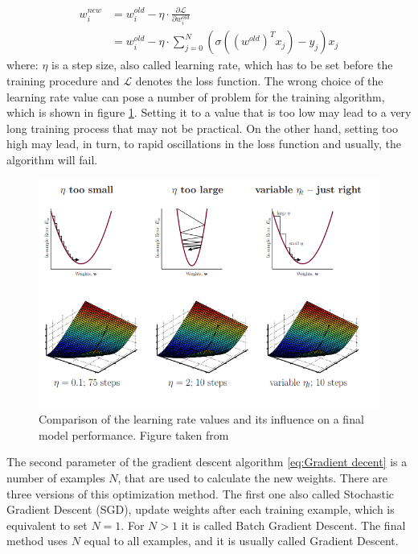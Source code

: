 \begin{align}
\label{eq:Gradient decent}
    w_{i}^{new} &= w_{i}^{old} - \eta \cdot \frac{\partial \mathcal{L}}{\partial w_{i}^{old}} \nonumber \\
    &= w_{i}^{old} - \eta  \cdot \sum_{j=0}^{N} \left( \sigma((w^{old})^{T}x_{j}) - y_{j} \right) x_j
\end{align}
where: $\eta$ is a step size, also called learning rate, which has to be set before the training procedure and $\mathcal{L}$ denotes the loss function. The wrong choice of the learning rate value can pose a number of problem for the training algorithm, which is shown in figure \ref{fig:Gradient decent}. Setting it to a value that is too low may lead to a very long training process that may not be practical. On the other hand, setting too high may lead, in turn, to rapid oscillations in the loss function and usually, the algorithm will fail.

\begin{figure}[!h]
\centering
\includegraphics{figures/LR_learning_rate.PNG}
\caption{Comparison of the learning rate values and its influence on a final model performance. Figure taken from \cite{abu-musafa}  
\label{fig:Gradient decent}}
\end{figure}
The second parameter of the gradient descent algorithm \ref{eq:Gradient decent} is a number of examples $N$, that are used to calculate the new weights. There are three versions of this optimization method. The first one also called Stochastic Gradient Descent (SGD), update weights after each training example, which is equivalent to set $N=1$. For $N>1$ it is called Batch Gradient Descent. The final method uses $N$ equal to all examples, and it is usually called Gradient Descent.  

